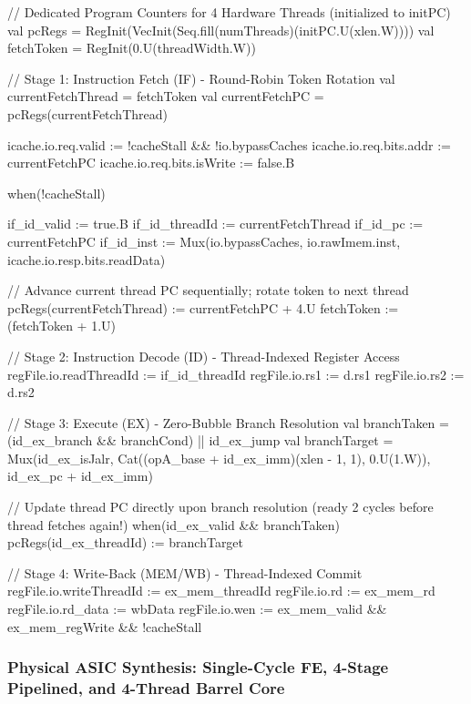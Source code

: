 \begin{chiselcode}[caption={Architectural excerpt of the 4-thread barrel core token-triggered execution and register dispatch (full implementation in \texttt{RTL/Chisel/src/main/scala/scabook/riscv/RiscvBarrel4T.scala}).}, label={lst:riscv_barrel4t_chisel}]
// Dedicated Program Counters for 4 Hardware Threads (initialized to initPC)
val pcRegs = RegInit(VecInit(Seq.fill(numThreads)(initPC.U(xlen.W))))
val fetchToken = RegInit(0.U(threadWidth.W))

// Stage 1: Instruction Fetch (IF) - Round-Robin Token Rotation
val currentFetchThread = fetchToken
val currentFetchPC     = pcRegs(currentFetchThread)

icache.io.req.valid        := !cacheStall && !io.bypassCaches
icache.io.req.bits.addr    := currentFetchPC
icache.io.req.bits.isWrite := false.B

when(!cacheStall) {
  if_id_valid    := true.B
  if_id_threadId := currentFetchThread
  if_id_pc       := currentFetchPC
  if_id_inst     := Mux(io.bypassCaches, io.rawImem.inst, icache.io.resp.bits.readData)

  // Advance current thread PC sequentially; rotate token to next thread
  pcRegs(currentFetchThread) := currentFetchPC + 4.U
  fetchToken := (fetchToken + 1.U) %
}

// Stage 2: Instruction Decode (ID) - Thread-Indexed Register Access
regFile.io.readThreadId := if_id_threadId
regFile.io.rs1          := d.rs1
regFile.io.rs2          := d.rs2

// Stage 3: Execute (EX) - Zero-Bubble Branch Resolution
val branchTaken  = (id_ex_branch && branchCond) || id_ex_jump
val branchTarget = Mux(id_ex_isJalr, Cat((opA_base + id_ex_imm)(xlen - 1, 1), 0.U(1.W)), id_ex_pc + id_ex_imm)

// Update thread PC directly upon branch resolution (ready 2 cycles before thread fetches again!)
when(id_ex_valid && branchTaken) {
  pcRegs(id_ex_threadId) := branchTarget
}

// Stage 4: Write-Back (MEM/WB) - Thread-Indexed Commit
regFile.io.writeThreadId := ex_mem_threadId
regFile.io.rd            := ex_mem_rd
regFile.io.rd_data       := wbData
regFile.io.wen           := ex_mem_valid && ex_mem_regWrite && !cacheStall
\end{chiselcode}


\subsubsection{Physical ASIC Synthesis: Single-Cycle FE, 4-Stage Pipelined, and 4-Thread Barrel Core}\label{subsec:asap7_4t_synthesis}

